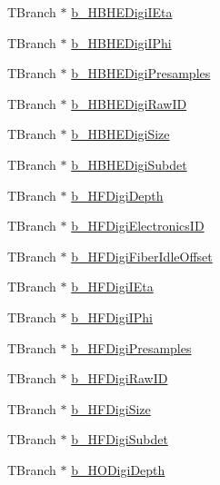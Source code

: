 \begin{DoxyCompactItemize}
\item 
T\+Branch $\ast$ \hyperlink{class_hcal_tuple_tree_ac89b0daae526046d2508a0c71dcd4460}{b\+\_\+\+H\+B\+H\+E\+Digi\+I\+Eta}
\item 
T\+Branch $\ast$ \hyperlink{class_hcal_tuple_tree_aee36bdefe9815bf0d2ba8fc845cacb76}{b\+\_\+\+H\+B\+H\+E\+Digi\+I\+Phi}
\item 
T\+Branch $\ast$ \hyperlink{class_hcal_tuple_tree_a88a9ed5712686cae5b65180be9356464}{b\+\_\+\+H\+B\+H\+E\+Digi\+Presamples}
\item 
T\+Branch $\ast$ \hyperlink{class_hcal_tuple_tree_a17f4f5752a1f30f0d6e6eb2d964204df}{b\+\_\+\+H\+B\+H\+E\+Digi\+Raw\+I\+D}
\item 
T\+Branch $\ast$ \hyperlink{class_hcal_tuple_tree_a8dfa0af54d6583ced45951fca821098a}{b\+\_\+\+H\+B\+H\+E\+Digi\+Size}
\item 
T\+Branch $\ast$ \hyperlink{class_hcal_tuple_tree_a83352cedcad5bab00ff723f05bbd8595}{b\+\_\+\+H\+B\+H\+E\+Digi\+Subdet}
\item 
T\+Branch $\ast$ \hyperlink{class_hcal_tuple_tree_a534f8ded1efb2b122e716b422c0b5c38}{b\+\_\+\+H\+F\+Digi\+Depth}
\item 
T\+Branch $\ast$ \hyperlink{class_hcal_tuple_tree_acfdc42d9d8334fec1ce727a40d0e516c}{b\+\_\+\+H\+F\+Digi\+Electronics\+I\+D}
\item 
T\+Branch $\ast$ \hyperlink{class_hcal_tuple_tree_a304c98fa8ce712bc83f5abcbb0343b6d}{b\+\_\+\+H\+F\+Digi\+Fiber\+Idle\+Offset}
\item 
T\+Branch $\ast$ \hyperlink{class_hcal_tuple_tree_a01e0fc502fcc61dd725ef0c4969e07b0}{b\+\_\+\+H\+F\+Digi\+I\+Eta}
\item 
T\+Branch $\ast$ \hyperlink{class_hcal_tuple_tree_a3babf2e37148283a58472514e1d1782c}{b\+\_\+\+H\+F\+Digi\+I\+Phi}
\item 
T\+Branch $\ast$ \hyperlink{class_hcal_tuple_tree_aed8d2d48206392ae0327c17a88ec70c3}{b\+\_\+\+H\+F\+Digi\+Presamples}
\item 
T\+Branch $\ast$ \hyperlink{class_hcal_tuple_tree_ae5834790911dc72d51600342e0c690b2}{b\+\_\+\+H\+F\+Digi\+Raw\+I\+D}
\item 
T\+Branch $\ast$ \hyperlink{class_hcal_tuple_tree_a7dc6644fce711632ef3e307cb787fb1d}{b\+\_\+\+H\+F\+Digi\+Size}
\item 
T\+Branch $\ast$ \hyperlink{class_hcal_tuple_tree_a368b90fe559482c1d29312d50802506b}{b\+\_\+\+H\+F\+Digi\+Subdet}
\item 
T\+Branch $\ast$ \hyperlink{class_hcal_tuple_tree_a2172531cd2c25e3a6dbd462bccada046}{b\+\_\+\+H\+O\+Digi\+Depth}

\end{DoxyCompactItemize}
